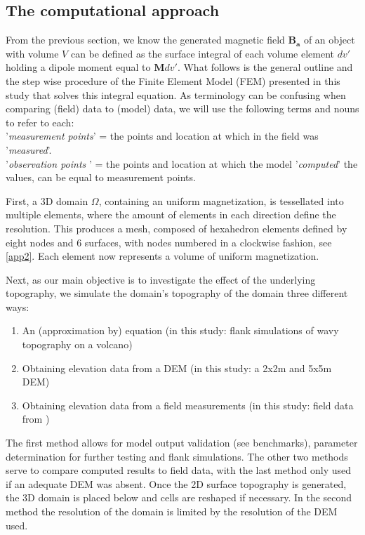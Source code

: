 
\subsection{The computational approach}
From the previous section, we know the generated magnetic field $\mathbf{B_a}$ of an object with volume $V$ can be defined as the surface integral of each volume element $\mathit{dv'}$ holding a dipole moment equal to $\mathbf{M}\mathit{dv'}$. What follows is the general outline and the step wise procedure of the Finite Element Model (FEM) presented in this study that solves this integral equation. As terminology can be confusing when comparing (field) data to (model) data, we will use the following terms and nouns to refer to each: \\
'\textit{measurement points}' = the points and location at which in the field was '\textit{measured}'. \\
'\textit{observation points} ' = the points and location at which the model '\textit{computed}' the values, can be equal to measurement points. 

\par
First, a 3D domain $\Omega$, containing an uniform magnetization, is tessellated into multiple elements, where the amount of elements in each direction define the resolution. This produces a mesh, composed of hexahedron elements defined by eight nodes and 6 surfaces, with nodes numbered in a clockwise fashion, see \ref{app2}. Each element now represents a volume of uniform magnetization. 
\par 
Next, as our main objective is to investigate the effect of the underlying topography, we simulate the domain's topography of the domain three different ways:
\begin{enumerate}
    \item An (approximation by) equation (in this study: flank simulations of wavy topography on a volcano)
    \item Obtaining elevation data from a DEM (in this study: a 2x2m and 5x5m DEM)
    \item Obtaining elevation data from a field measurements (in this study: field data from \parencite{Meyer23})
\end{enumerate}
The first method allows for model output validation (see benchmarks), parameter determination for further testing and flank simulations. The other two methods serve to compare computed results to field data, with the last method only used if an adequate DEM was absent. Once the 2D surface topography is generated, the 3D domain is placed below and cells are reshaped if necessary. In the second method the resolution of the domain is limited by the resolution of the DEM used. \par 

